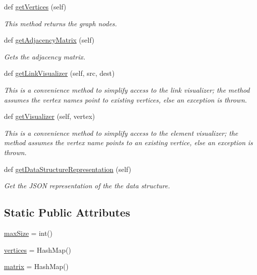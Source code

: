 \begin{DoxyCompactItemize}
def \hyperlink{class_graph_adj_matrix_1_1_graph_adj_matrix_aa3fbe3365150b94bdd232788defe7739}{get\+Vertices} (self)
\begin{DoxyCompactList}\small\item\em This method returns the graph nodes. \end{DoxyCompactList}\item 
def \hyperlink{class_graph_adj_matrix_1_1_graph_adj_matrix_ae5dc33de984eb621e610f1b79be6d65a}{get\+Adjacency\+Matrix} (self)
\begin{DoxyCompactList}\small\item\em Gets the adjacency matrix. \end{DoxyCompactList}\item 
def \hyperlink{class_graph_adj_matrix_1_1_graph_adj_matrix_a24dbf5218e61389b10fc969dcff5d7b0}{get\+Link\+Visualizer} (self, src, dest)
\begin{DoxyCompactList}\small\item\em This is a convenience method to simplify access to the link visualizer; the method assumes the vertex names point to existing vertices, else an exception is thrown. \end{DoxyCompactList}\item 
def \hyperlink{class_graph_adj_matrix_1_1_graph_adj_matrix_a17a86c39cd089c4a7379a47ffcff3390}{get\+Visualizer} (self, vertex)
\begin{DoxyCompactList}\small\item\em This is a convenience method to simplify access to the element visualizer; the method assumes the vertex name points to an existing vertice, else an exception is thrown. \end{DoxyCompactList}\item 
def \hyperlink{class_graph_adj_matrix_1_1_graph_adj_matrix_a1e44a6961936900a35b6e812940fbfa8}{get\+Data\+Structure\+Representation} (self)
\begin{DoxyCompactList}\small\item\em Get the J\+S\+ON representation of the the data structure. \end{DoxyCompactList}\end{DoxyCompactItemize}
\subsection*{Static Public Attributes}
\begin{DoxyCompactItemize}
\item 
\hyperlink{class_graph_adj_matrix_1_1_graph_adj_matrix_a45edf0723e51301b7789e92514d128f4}{max\+Size} = int()
\item 
\hyperlink{class_graph_adj_matrix_1_1_graph_adj_matrix_a85c454d09e82706b00563af339c0147f}{vertices} = Hash\+Map()
\item 
\hyperlink{class_graph_adj_matrix_1_1_graph_adj_matrix_aba658e4996d8a25b8c7260bb0f936ea7}{matrix} = Hash\+Map()
\end{DoxyCompactItemize}


